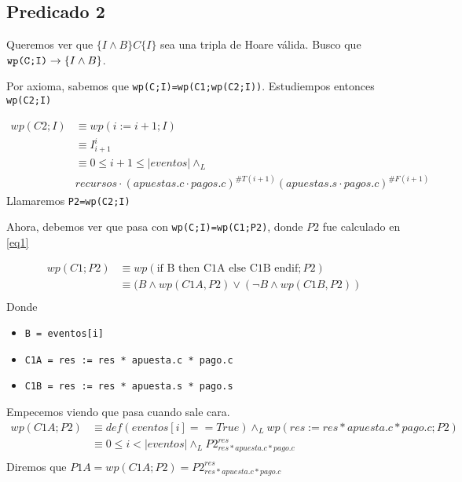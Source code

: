 \documentclass[../document.tex]{subfiles}
\begin{document}
\subsection*{Predicado 2}
Queremos ver que $\{I \land B\}C\{I\}$ sea una tripla de Hoare válida. Busco que $\verb+wp(C;I)+ \to \{I \land B\}$.

Por axioma, sabemos que \verb+wp(C;I)=wp(C1;wp(C2;I))+. Estudiempos entonces \verb|wp(C2;I)|

\begin{equation} \label{eq1}
\begin{split}
wp(C2;I) & \equiv wp(i := i+1;I) \\
         & \equiv I^{i}_{i+1} \\
         & \equiv 0\leq i+1 \leq |eventos| \land_L\\ 
         &recursos \cdot (apuestas.c\cdot pagos.c)^{\#T(i+1)}(apuestas.s\cdot pagos.c)^{\#F(i+1)}
\end{split}
\end{equation}
Llamaremos \verb|P2=wp(C2;I)|

Ahora, debemos ver que pasa con \verb+wp(C;I)=wp(C1;P2)+, donde $P2$ fue calculado en \ref{eq1}

\begin{equation} \label{eq2}
\begin{split}
wp(C1;P2) & \equiv wp(\text{if B then C1A else C1B endif};P2) \\
          & \equiv (B \land wp(C1A, P2) \lor (\neg B \land wp(C1B, P2)) \\
\end{split}
\end{equation}
Donde
\begin{itemize}
    \item \verb|B = eventos[i]|
    \item \verb|C1A = res := res * apuesta.c * pago.c|
    \item \verb|C1B = res := res * apuesta.s * pago.s|
\end{itemize}

Empecemos viendo que pasa cuando sale cara.
\begin{equation} \label{eq2.a}
\begin{split}
wp(C1A;P2) & \equiv def(eventos[i]==True) \land_{L} wp(res := res * apuesta.c * pago.c; P2) \\
           & \equiv 0\leq i<|eventos| \land_{L} P2^{res}_{res * apuesta.c * pago.c} \\
\end{split}
\end{equation}
Diremos que $P1A = wp(C1A;P2) = P2^{res}_{res * apuesta.c * pago.c}$
\end{document}
